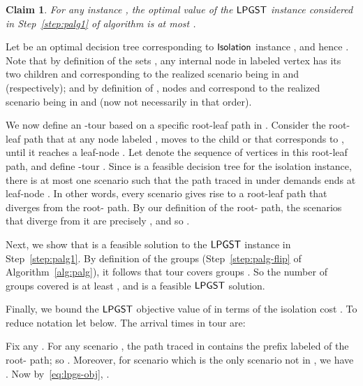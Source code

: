 \documentclass[11pt]{article}
\newtheorem{claim}[thm]{Claim}
\def\isoprob{\ensuremath{{\sf Isolation}}\xspace}
\def\lpgst{\ensuremath{{\sf LPGST}}\xspace}
\newenvironment{pf}{

\noindent{\bf Proof:}} {\hfill


}
\begin{document}
\begin{claim}\label{cl:alg1}
  For any instance , the
  optimal value of the \lpgst instance considered in
  Step~\ref{step:palg1} of algorithm  is at most
  .
   \end{claim}
\begin{pf}
  Let  be an optimal decision tree corresponding to  \isoprob
  instance , and hence . Note that by
  definition of the sets , any internal node in
   labeled vertex  has its two children  and 
  corresponding to the realized scenario being in  and  (respectively); and by
  definition of , nodes  and 
  correspond  to the realized scenario being in  and  (now not necessarily in that order).

We now define an -tour  based on a specific root-leaf path in .   Consider the root-leaf path that at any 
node labeled , moves  to the child  or  that corresponds to
  , until it reaches a leaf-node . Let  denote the sequence of vertices in this root-leaf path, and define -tour   
   .  
  Since  is a feasible decision tree for the isolation
  instance,  there is at most one scenario  such that the path  traced in  under demands  ends at leaf-node . In other words,  every scenario  gives rise to a
  root-leaf path  that diverges from the root- path.  By our definition of the root- path,  the scenarios that diverge  from it are precisely , and so 
  .
  
  Next, we show that  is a feasible  solution to the
  \lpgst instance in Step~\ref{step:palg1}. By definition of the groups  (Step~\ref{step:palg-flip} of Algorithm~\ref{alg:palg}), it follows that tour  covers  groups . So the number of groups covered is at least , and  is a feasible \lpgst solution. 
  
Finally, we bound the \lpgst objective value of  in terms of the isolation cost . To reduce notation let  below. 
The arrival times in tour  are: 

Fix any . For any scenario ,  the path  traced in  contains the prefix labeled  of the root- path; so . Moreover, for scenario  which is the only scenario not in ,  we have . Now by~\eqref{eq:lpgs-obj}, . 
\end{pf}
\end{document}
